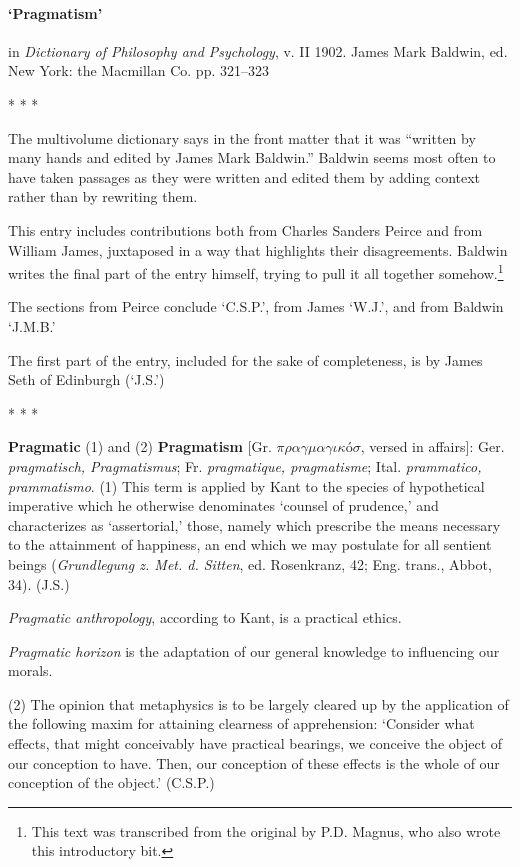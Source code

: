 \documentclass{article}
\newcommand{\spacer}{\medskip\centerline{* * *}\medskip}
\begin{document}
\paragraph{`Pragmatism'} in \emph{Dictionary of Philosophy and Psychology}, v. II 1902. James Mark Baldwin, ed. New York: the Macmillan Co. pp. 321--323

\spacer

The multivolume dictionary says in the front matter that it was ``written by many hands and edited by James Mark Baldwin.'' Baldwin seems most often to have taken passages as they were written and edited them by adding context rather than by rewriting them.

This entry includes contributions both from Charles Sanders Peirce and from William James, juxtaposed in a way that highlights their disagreements. Baldwin writes the final part of the entry himself, trying to pull it all together somehow.\footnote{This text was transcribed from the original by P.D. Magnus, who also wrote this introductory bit.}

The sections from Peirce conclude `C.S.P.', from James `W.J.', and from Baldwin `J.M.B.'

The first part of the entry, included for the sake of completeness, is by James Seth of Edinburgh (`J.S.')


\spacer







\textbf{Pragmatic} (1) and (2) \textbf{Pragmatism} [Gr. $\pi\rho\alpha\gamma\mu\alpha\gamma\iota\kappa$\'{o}$\sigma$, versed in affairs]: Ger. \textit{pragmatisch, Pragmatismus}; Fr. \textit{pragmatique, pragmatisme}; Ital. \textit{prammatico, prammatismo}. (1) This term is applied by Kant to the species of hypothetical imperative which he otherwise denominates `counsel of prudence,' and characterizes as `assertorial,' those, namely which prescribe the means necessary to the attainment of happiness, an end which we may postulate for all sentient beings (\textit{Grundlegung z. Met. d. Sitten}, ed. Rosenkranz, 42; Eng. trans., Abbot, 34). \hfill (J.S.)

\textit{Pragmatic anthropology}, according to Kant, is a practical ethics.

\textit{Pragmatic horizon} is the adaptation of our general knowledge to influencing our morals.


(2) The opinion that metaphysics is to be largely cleared up by the application of the following maxim for attaining clearness of apprehension: `Consider what effects, that might conceivably have practical bearings, we conceive the object of our conception to have. Then, our conception of these effects is the whole of our conception of the object.' \hfill (C.S.P.)
\end{document}
